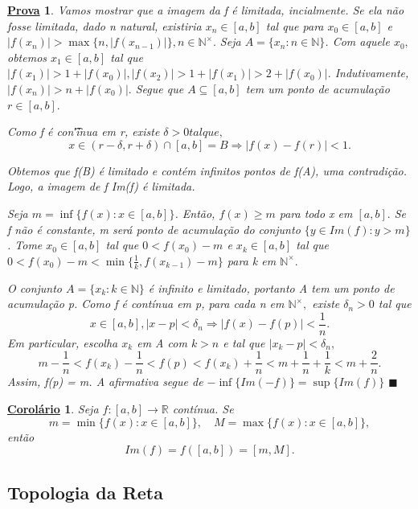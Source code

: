 \documentclass{article}
\newtheorem*{proof*}{\underline{Prova}}
\newtheorem*{crl*}{\underline{Corol\'ario}}
\renewcommand\qedsymbol{$\blacksquare$}
\begin{document}
\begin{proof*}
  Vamos mostrar que a imagem da f \'e limitada, incialmente. Se ela n\~ao fosse limitada, dado n natural, existiria $x_{n}\in[a, b]$
  tal que para $x_{0}\in[a, b]$ e $|f(x_{n})| > \max{\{n, |f(x_{n-1})|\}}, n\in \mathbb{N}^{\times}.$ Seja $A=\{x_{n}:n\in \mathbb{N}\}$.
  Com aquele $x_{0},$ obtemos $x_{1}\in[a, b]$ tal que $|f(x_{1})| > 1 + |f(x_{0})|, |f(x_{2})| > 1 + |f(x_{1})| > 2 + |f(x_{0})|.$
  Indutivamente, $|f(x_{n})| > n + |f(x_{0})|.$ Segue que $A\subseteq{[a, b]}$ tem um ponto de acumula\c c\~ao $r\in[a, b].$

  Como f \'e con\t'inua em r, existe $\delta > 0 tal que,$ 
    $$
    x\in(r-\delta , r+\delta )\cap[a, b] = B \Rightarrow |f(x)-f(r)|<1.
    $$

    Obtemos que f(B) \'e limitado e cont\'em infinitos pontos de f(A), uma contradi\c c\~ao. Logo, a imagem de f Im(f) \'e limitada.

    Seja $m=\inf{\{f(x):x\in[a, b]\}}$. Ent\~ao, $f(x)\geq m$ para todo x em $[a, b].$ Se f n\~ao \'e constante, m ser\'a ponto de
    acumula\c c\~ao do conjunto $\{y\in{Im(f)}: y > m\}$. Tome $x_{0}\in[a, b]$ tal que $0 < f(x_{0}) - m$ e $x_{k}\in[a, b]$
    tal que $0 < f(x_{0}) - m < \min{\{\frac{1}{k}, f(x_{k-1})-m\}}$ para k em $\mathbb{N}^{\times}.$

    O conjunto $A = \{x_{k}: k\in \mathbb{N}\}$ \'e infinito e limitado, portanto A tem um ponto de acumula\c c\~ao p. Como f \'e cont\'inua
    em p, para cada n em $\mathbb{N}^{\times},$ existe $\delta_{n} > 0$ tal que 
      $$
      x\in[a, b], |x-p|<\delta_{n} \Rightarrow |f(x)-f(p)|<\frac{1}{n}.
      $$
      Em particular, escolha $x_{k}$ em A com $k>n$ e tal que $|x_{k}-p|<\delta_{n},$ 
        $$
          m-\frac{1}{n} < f(x_{k})-\frac{1}{n}<f(p)<f(x_{k}) + \frac{1}{n} < m + \frac{1}{n} + \frac{1}{k} < m + \frac{2}{n}.
        $$
        Assim, f(p) = m. A afirmativa segue de $-\inf{\{Im(-f)\}} = \sup\{Im(f)\}$ \qedsymbol
\end{proof*}
\begin{crl*}
  Seja $f:[a, b]\rightarrow \mathbb{R}$ cont\'inua. Se 
   $$
    m=\min{\{f(x):x\in[a, b]\}},\quad M = \max{\{f(x):x\in[a, b]\}},
   $$
   ent\~ao 
   $$
     Im(f) = f([a, b]) = [m, M].
   $$
\end{crl*}

\subsection{Topologia da Reta}
\end{document}
